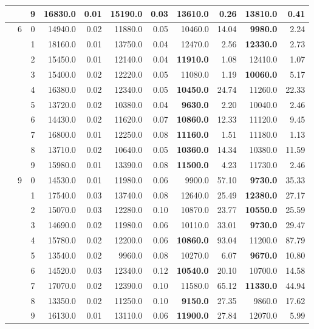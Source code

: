 {\begin{longtable}{ccc|rr|rr|rr|rr}
 &  & 9 & 16830.0 & 0.01 & 15190.0 & 0.03 & \textbf{13610.0} & 0.26 & 13810.0 & 0.41 \\ \hline
 & 6 & 0 & 14940.0 & 0.02 & 11880.0 & 0.05 & 10460.0 & 14.04 & \textbf{9980.0} & 2.24 \\
 &  & 1 & 18160.0 & 0.01 & 13750.0 & 0.04 & 12470.0 & 2.56 & \textbf{12330.0} & 2.73 \\
 &  & 2 & 15450.0 & 0.01 & 12140.0 & 0.04 & \textbf{11910.0} & 1.08 & 12410.0 & 1.07 \\
 &  & 3 & 15400.0 & 0.02 & 12220.0 & 0.05 & 11080.0 & 1.19 & \textbf{10060.0} & 5.17 \\
 &  & 4 & 16380.0 & 0.02 & 12340.0 & 0.05 & \textbf{10450.0} & 24.74 & 11260.0 & 22.33 \\
 &  & 5 & 13720.0 & 0.02 & 10380.0 & 0.04 & \textbf{9630.0} & 2.20 & 10040.0 & 2.46 \\
 &  & 6 & 14430.0 & 0.02 & 11620.0 & 0.07 & \textbf{10860.0} & 12.33 & 11120.0 & 9.45 \\
 &  & 7 & 16800.0 & 0.01 & 12250.0 & 0.08 & \textbf{11160.0} & 1.51 & 11180.0 & 1.13 \\
 &  & 8 & 13710.0 & 0.02 & 10640.0 & 0.05 & \textbf{10360.0} & 14.34 & 10380.0 & 11.59 \\
 &  & 9 & 15980.0 & 0.01 & 13390.0 & 0.08 & \textbf{11500.0} & 4.23 & 11730.0 & 2.46 \\ \hline
 & 9 & 0 & 14530.0 & 0.01 & 11980.0 & 0.06 & 9900.0 & 57.10 & \textbf{9730.0} & 35.33 \\
 &  & 1 & 17540.0 & 0.03 & 13740.0 & 0.08 & 12640.0 & 25.49 & \textbf{12380.0} & 27.17 \\
 &  & 2 & 15070.0 & 0.03 & 12280.0 & 0.10 & 10870.0 & 23.77 & \textbf{10550.0} & 25.59 \\
 &  & 3 & 14690.0 & 0.02 & 11980.0 & 0.06 & 10110.0 & 33.01 & \textbf{9730.0} & 29.47 \\
 &  & 4 & 15780.0 & 0.02 & 12200.0 & 0.06 & \textbf{10860.0} & 93.04 & 11200.0 & 87.79 \\
 &  & 5 & 13540.0 & 0.02 & 9960.0 & 0.08 & 10270.0 & 6.07 & \textbf{9670.0} & 10.80 \\
 &  & 6 & 14520.0 & 0.03 & 12340.0 & 0.12 & \textbf{10540.0} & 20.10 & 10700.0 & 14.58 \\
 &  & 7 & 17070.0 & 0.02 & 12390.0 & 0.10 & 11580.0 & 65.12 & \textbf{11330.0} & 44.94 \\
 &  & 8 & 13350.0 & 0.02 & 11250.0 & 0.10 & \textbf{9150.0} & 27.35 & 9860.0 & 17.62 \\
 &  & 9 & 16130.0 & 0.01 & 13110.0 & 0.06 & \textbf{11900.0} & 27.84 & 12070.0 & 5.99 \\

\end{longtable}}
